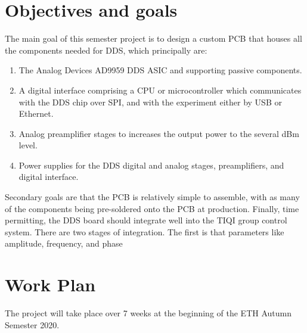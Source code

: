 \documentclass[10pt]{article}
\begin{document}
\section*{Objectives and goals}
The main goal of this semester project is to design a custom PCB that houses all the components needed for DDS, which principally are:
\begin{enumerate}
	\item The Analog Devices AD9959 DDS ASIC and supporting passive components.
	\item A digital interface comprising a CPU or microcontroller which communicates with the DDS chip over SPI, and with the experiment either by USB or Ethernet.
	\item Analog preamplifier stages to increases the output power to the several dBm level.
	\item Power supplies for the DDS digital and analog stages, preamplifiers, and digital interface.
\end{enumerate}

Secondary goals are that the PCB is relatively simple to assemble, with as many of the components being pre-soldered onto the PCB at production.
Finally, time permitting, the DDS board should integrate well into the TIQI group control system. There are two stages of integration. The first is that parameters like amplitude, frequency, and phase

\newpage

\section*{Work Plan}

The project will take place over 7 weeks at the beginning of the ETH Autumn Semester 2020.
\end{document}
